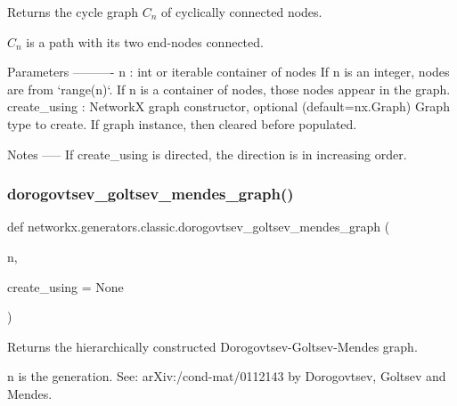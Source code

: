 \begin{DoxyVerb}Returns the cycle graph $C_n$ of cyclically connected nodes.

$C_n$ is a path with its two end-nodes connected.

Parameters
----------
n : int or iterable container of nodes
    If n is an integer, nodes are from `range(n)`.
    If n is a container of nodes, those nodes appear in the graph.
create_using : NetworkX graph constructor, optional (default=nx.Graph)
   Graph type to create. If graph instance, then cleared before populated.

Notes
-----
If create_using is directed, the direction is in increasing order.\end{DoxyVerb}
 \mbox{\label{namespacenetworkx_1_1generators_1_1classic_a90726aa681ac05681d9c13cbb9c1a06c}} 
\subsubsection{\texorpdfstring{dorogovtsev\+\_\+goltsev\+\_\+mendes\+\_\+graph()}{dorogovtsev\_goltsev\_mendes\_graph()}}
{\footnotesize\ttfamily def networkx.\+generators.\+classic.\+dorogovtsev\+\_\+goltsev\+\_\+mendes\+\_\+graph (\begin{DoxyParamCaption}\item[{}]{n,  }\item[{}]{create\+\_\+using = {\ttfamily None} }\end{DoxyParamCaption})}

\begin{DoxyVerb}Returns the hierarchically constructed Dorogovtsev-Goltsev-Mendes graph.

n is the generation.
See: arXiv:/cond-mat/0112143 by Dorogovtsev, Goltsev and Mendes.\end{DoxyVerb}
 \mbox{\label{namespacenetworkx_1_1generators_1_1classic_a93280f4b436feff8bfd9ea04ec5e74b0}} 
